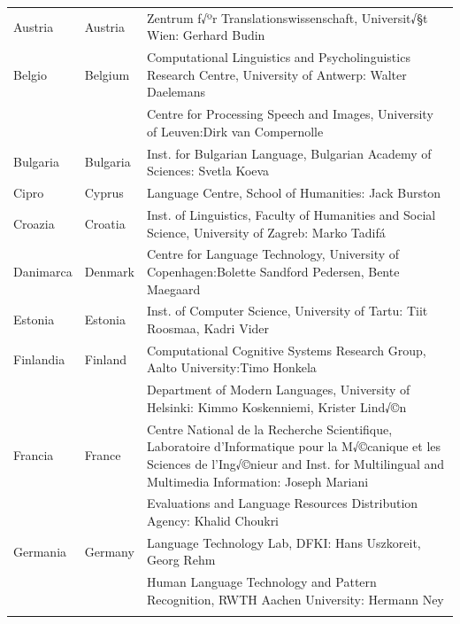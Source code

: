 \small
\begin{longtable}{llp{110mm}}
  
  Austria & \textcolor{grey1}{Austria} & Zentrum f√ºr Translationswissenschaft, Universit√§t Wien: Gerhard Budin\\ \addlinespace 
  Belgio & \textcolor{grey1}{Belgium} & Computational Linguistics and Psycholinguistics Research Centre, University of Antwerp: Walter Daelemans\\ \addlinespace
  & & Centre for Processing Speech and Images, University of Leuven:\newline Dirk van Compernolle \\ \addlinespace
  Bulgaria & \textcolor{grey1}{Bulgaria} & Inst. for Bulgarian Language, Bulgarian Academy of Sciences: Svetla Koeva \\ \addlinespace
  Cipro & \textcolor{grey1}{Cyprus} & Language Centre, School of Humanities: Jack Burston \\ \addlinespace
  Croazia & \textcolor{grey1}{Croatia} & Inst. of Linguistics, Faculty of Humanities and Social Science, University of Zagreb: Marko Tadiƒá \\ \addlinespace
  Danimarca &  \textcolor{grey1}{Denmark} & Centre for Language Technology, University of Copenhagen:\newline Bolette Sandford Pedersen, Bente Maegaard\\ \addlinespace
  Estonia & \textcolor{grey1}{Estonia} & Inst. of Computer Science, University of Tartu: Tiit Roosmaa, Kadri Vider\\ \addlinespace
  Finlandia & \textcolor{grey1}{Finland} & Computational Cognitive Systems Research Group, Aalto University:\newline Timo Honkela\\ \addlinespace
  & & Department of Modern Languages, University of Helsinki: Kimmo Koskenniemi, Krister Lind√©n \\ \addlinespace
  Francia & \textcolor{grey1}{France} & Centre National de la Recherche Scientifique, Laboratoire d'Informatique pour la M√©canique et les Sciences de l'Ing√©nieur and Inst. for Multilingual and Multimedia Information: Joseph Mariani \\ \addlinespace
  & & Evaluations and Language Resources Distribution Agency: Khalid Choukri\\ \addlinespace 
  Germania & \textcolor{grey1}{Germany} & Language Technology Lab, DFKI: Hans Uszkoreit, Georg Rehm\\ \addlinespace
  & & Human Language Technology and Pattern Recognition, RWTH Aachen University: Hermann Ney \\ \addlinespace

\end{longtable}
